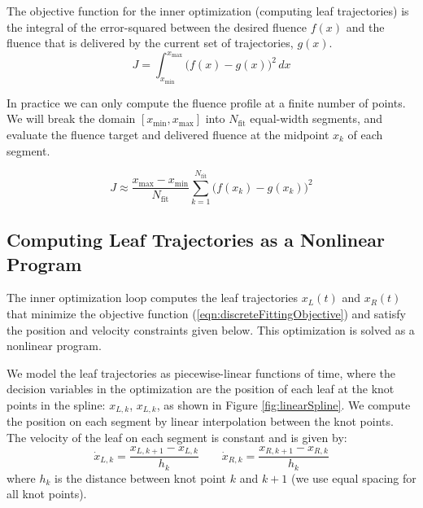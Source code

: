 \documentclass{iopart}
\begin{document}

The objective function for the inner optimization (computing leaf trajectories)
is the integral of the error-squared between the desired fluence $f(x)$ and the fluence that
is delivered by the current set of trajectories, $g(x)$.
\begin{equation}
  J = \int_{x_\text{min}}^{x_\text{max}} \! \bigg( f(x) - g(x) \bigg)^2 \,dx
  \label{eqn:continuousFittingObjective}
\end{equation}

In practice we can only compute the fluence profile at a finite number of points. We will break the domain $[x_\text{min}, x_\text{max}]$ into $N_\text{fit}$ equal-width segments,
and evaluate the fluence target and delivered fluence at the midpoint $x_k$ of each segment.

\begin{equation}
  J \approx \frac{x_\text{max} - x_\text{min}}{N_\text{fit}}
  \sum_{k = 1}^{N_\text{fit}} \! \bigg( f(x_k) - g(x_k) \bigg)^2
  \label{eqn:discreteFittingObjective}
\end{equation}

\subsection{Computing Leaf Trajectories as a Nonlinear Program}
\label{sec:LeafTrajectoryAsNLP}

The inner optimization loop computes the leaf trajectories $x_L(t)$ and $x_R(t)$
that minimize the objective function (\ref{eqn:discreteFittingObjective})
and satisfy the position and velocity constraints given below.
This optimization is solved as a nonlinear program.

We model the leaf trajectories as piecewise-linear functions of time,
where the decision variables in the optimization are the position of each leaf
at the knot points in the spline: $x_{L, k}$, $x_{L, k}$, as shown in Figure \ref{fig:linearSpline}. We compute the position on each segment by linear interpolation between the knot points. The velocity of the leaf on each segment is constant and is given by:
\begin{equation}
  \dot{x}_{L, k} = \frac{x_{L, k+1} - x_{L, k}}{h_k}
  \quad \quad
  \dot{x}_{R, k} = \frac{x_{R, k+1} - x_{R, k}}{h_k}
\end{equation}
\noindent where $h_k$ is the distance between knot point $k$ and $k+1$ (we use equal spacing for all knot points).
\end{document}
